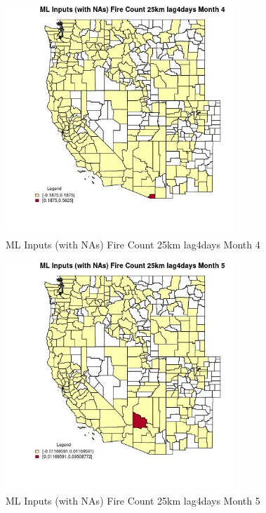 \begin{figure} 
\centering  
\includegraphics[width=0.77\textwidth]{Code_Outputs/Report_ML_input_PM25_Step4_part_e_de_duplicated_aves_compiled_2019-05-20wNAs_CountyFire_Count_25km_lag4daysmedianMonth4.jpg} 
\caption{\label{fig:Report_ML_input_PM25_Step4_part_e_de_duplicated_aves_compiled_2019-05-20wNAsCountyFire_Count_25km_lag4daysmedianMonth4}ML Inputs (with NAs) Fire Count 25km lag4days Month 4} 
\end{figure} 
 

\begin{figure} 
\centering  
\includegraphics[width=0.77\textwidth]{Code_Outputs/Report_ML_input_PM25_Step4_part_e_de_duplicated_aves_compiled_2019-05-20wNAs_CountyFire_Count_25km_lag4daysmedianMonth5.jpg} 
\caption{\label{fig:Report_ML_input_PM25_Step4_part_e_de_duplicated_aves_compiled_2019-05-20wNAsCountyFire_Count_25km_lag4daysmedianMonth5}ML Inputs (with NAs) Fire Count 25km lag4days Month 5} 
\end{figure} 
 

